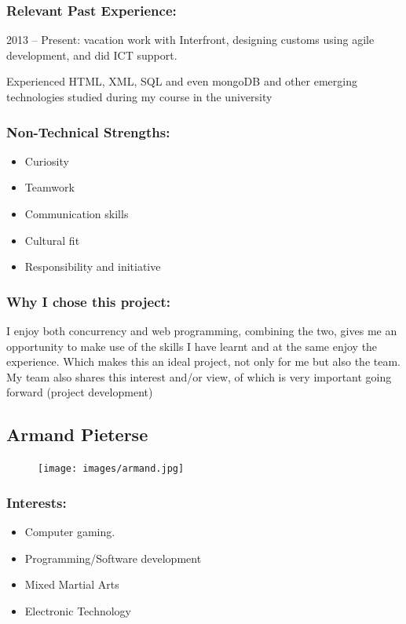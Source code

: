 \subsubsection{Relevant Past Experience:}
\par{2013 – Present: vacation work with Interfront, designing customs using agile development, and did ICT support.
}
\par{Experienced HTML, XML, SQL and even mongoDB and other emerging technologies studied during my course in the university
}
\subsubsection{Non-Technical Strengths:}
\begin{itemize}
		\item Curiosity
		\item Teamwork
		\item Communication skills
		\item Cultural fit
		\item Responsibility and initiative
	\end{itemize}
\subsubsection{Why I chose this project:}
\par{I enjoy both concurrency and web programming, combining the two, gives me an opportunity to make use of the skills I have learnt and at the same enjoy the experience. Which makes this an ideal project, not only for me but also the team. My team also shares this interest and/or view, of which is very important going forward (project development)
}

\newpage
\subsection{Armand Pieterse} 
\begin{figure}[h]
			\center
			\texttt{[image: images/armand.jpg]}
\end{figure}
\subsubsection{Interests:}
	\begin{itemize}
		\item Computer gaming.
		\item Programming/Software development
		\item Mixed Martial Arts
		\item Electronic Technology
	\end{itemize}
		
